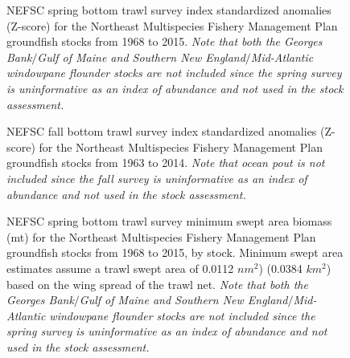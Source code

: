 	\begin{figure}
		\centering	
		\captionsetup{singlelinecheck=off}
		\caption[.]{NEFSC spring bottom trawl survey index standardized anomalies (Z-score) for the Northeast Multispecies Fishery Management Plan groundfish stocks from 1968 to 2015. \textit{Note that both the Georges Bank$/$Gulf of Maine and Southern New England$/$Mid-Atlantic windowpane flounder stocks are not included since the spring survey is uninformative as an index of abundance and not used in the stock assessment.}	}	
		\label{nefscSpringResiduals}
	\end{figure}
	\clearpage



	\begin{figure}
		\centering	
		\captionsetup{singlelinecheck=off}
		\caption[.]{NEFSC fall bottom trawl survey index standardized anomalies (Z-score) for the Northeast Multispecies Fishery Management Plan groundfish stocks from 1963 to 2014. \textit{Note that ocean pout is not included since the fall survey is uninformative as an index of abundance and not used in the stock assessment.}	}	
		\label{nefscFallResiduals}
	\end{figure}
	\clearpage




	\begin{figure}
		\centering	
		\captionsetup{singlelinecheck=off}
		\caption[.]{NEFSC spring bottom trawl survey minimum swept area biomass (mt) for the Northeast Multispecies Fishery Management Plan groundfish stocks from 1968 to 2015, by stock. Minimum swept area estimates assume a trawl swept area of 0.0112 $nm^{2}$) (0.0384 $km^{2}$) based on the wing spread of the trawl net. \textit{Note that both the Georges Bank$/$Gulf of Maine and Southern New England$/$Mid-Atlantic windowpane flounder stocks are not included since the spring survey is uninformative as an index of abundance and not used in the stock assessment.}	}	
		\label{nefscSpringMinSweptAreaBiomass}
	\end{figure}
	\clearpage


